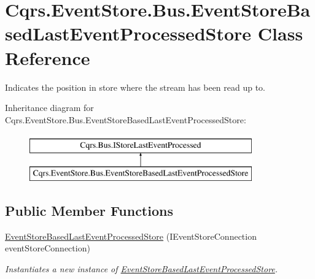 \hypertarget{classCqrs_1_1EventStore_1_1Bus_1_1EventStoreBasedLastEventProcessedStore}{}\section{Cqrs.\+Event\+Store.\+Bus.\+Event\+Store\+Based\+Last\+Event\+Processed\+Store Class Reference}
\label{classCqrs_1_1EventStore_1_1Bus_1_1EventStoreBasedLastEventProcessedStore}


Indicates the position in store where the stream has been read up to.  


Inheritance diagram for Cqrs.\+Event\+Store.\+Bus.\+Event\+Store\+Based\+Last\+Event\+Processed\+Store\+:\begin{figure}[H]
\begin{center}
\leavevmode
\includegraphics[height=2.000000cm]{classCqrs_1_1EventStore_1_1Bus_1_1EventStoreBasedLastEventProcessedStore}
\end{center}
\end{figure}
\subsection*{Public Member Functions}
\begin{DoxyCompactItemize}
\item 
\hyperlink{classCqrs_1_1EventStore_1_1Bus_1_1EventStoreBasedLastEventProcessedStore_a54dc3860c38026fd298bd204e3079490_a54dc3860c38026fd298bd204e3079490}{Event\+Store\+Based\+Last\+Event\+Processed\+Store} (I\+Event\+Store\+Connection event\+Store\+Connection)
\begin{DoxyCompactList}\small\item\em Instantiates a new instance of \hyperlink{classCqrs_1_1EventStore_1_1Bus_1_1EventStoreBasedLastEventProcessedStore}{Event\+Store\+Based\+Last\+Event\+Processed\+Store}. \end{DoxyCompactList}\end{DoxyCompactItemize}

